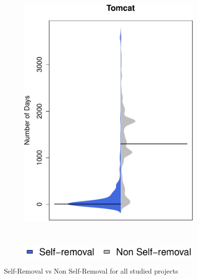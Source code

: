 \begin{figure}[t]
\begin{subfigure}[b]{0.20\textwidth}
	 		\includegraphics[width=\textwidth]{figures/test/tomcat_update.pdf}
	 		\label{fig:removal_comparison_tomcat} 
	 	\end{subfigure}
	 	
	 	~
	 	~
	 	~
	\begin{subfigure}[b]{0.25\textwidth}
		\includegraphics[width=\textwidth]{figures/test/legend.pdf}
	\end{subfigure}
	\caption{Self-Removal vs Non Self-Removal for all studied projects}
	 
\end{figure}




